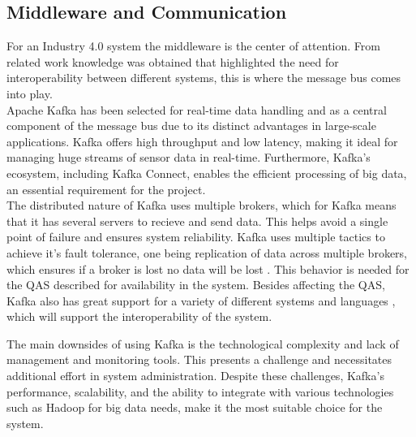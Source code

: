\subsection{\textbf{Middleware and Communication}}
For an Industry 4.0 system the middleware is the center of attention. From related work knowledge was obtained that highlighted the need for interoperability between different systems, this is where the message bus comes into play. \vspace{2mm} \\
Apache Kafka \cite{Apache2022Connect} has been selected for real-time data handling and as a central component of the message bus due to its distinct advantages in large-scale applications. Kafka offers high throughput and low latency, making it ideal for managing huge streams of sensor data in real-time. Furthermore, Kafka's ecosystem, including Kafka Connect, enables the efficient processing of big data, an essential requirement for the project. \vspace{2mm} \\

The distributed nature of Kafka uses multiple brokers, which for Kafka means that it has several servers to recieve and send data. This helps avoid a single point of failure and ensures system reliability. Kafka uses multiple tactics to achieve it's fault tolerance, one being replication of data across multiple brokers, which ensures if a broker is lost no data will be lost \cite{AltexSoft_2022}. This behavior is needed for the QAS described for availability in the system.
Besides affecting the QAS, Kafka also has great support for a variety of different systems and languages \cite{AltexSoft_2022}, which will support the interoperability of the system. \vspace{2mm}

The main downsides of using Kafka is the technological complexity and lack of management and monitoring tools. This presents a challenge and necessitates additional effort in system administration. Despite these challenges, Kafka's performance, scalability, and the ability to integrate with various technologies such as Hadoop for big data needs, make it the most suitable choice for the system. \vspace{2mm}


